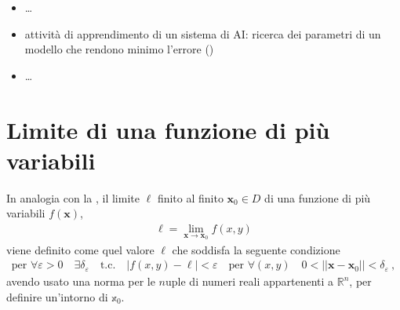 \documentclass[letterpaper,10pt,italian]{jupyterBook}
\begin{document}
\begin{itemize}
\begin{itemize}
\item {} 
\sphinxAtStartPar
…

\item {} 
\sphinxAtStartPar
attività di apprendimento di un sistema di AI: ricerca dei parametri di un modello che rendono minimo l’errore ()

\item {} 
\sphinxAtStartPar
…

\end{itemize}

\end{itemize}



\sphinxstepscope


\section{Limite di una funzione di più variabili}
\label{\detokenize{ch/multivariable-calculus/limits:limite-di-una-funzione-di-piu-variabili}}\label{\detokenize{ch/multivariable-calculus/limits:multivariable-calculus-limit}}\label{\detokenize{ch/multivariable-calculus/limits::doc}}
\sphinxAtStartPar
In analogia con la {\hyperref[\detokenize{ch/infinitesimal_calculus/analysis:infinitesimal-calculus-limits-def}]{}}, il limite \(\ell\) finito al finito \(\mathbf{x}_0 \in D\) di una funzione di più variabili \(f(\mathbf{x})\),
\begin{equation*}
\begin{split}\ell = \lim_{\mathbf{x} \rightarrow \mathbf{x}_0} f(x,y)\end{split}
\end{equation*}
\sphinxAtStartPar
viene definito come quel valore \(\ell\) che soddisfa la seguente condizione
\begin{equation*}
\begin{split}\text{per } \forall \varepsilon > 0 \quad \exists \delta_{\varepsilon} \quad \text{t.c.} \quad |f(x,y) - \ell| < \varepsilon \quad \text{per } \forall (x,y) \quad 0 < || \mathbf{x} - \mathbf{x}_0|| < \delta_\varepsilon \ ,\end{split}
\end{equation*}
\sphinxAtStartPar
avendo usato una norma per le \(n\)\sphinxhyphen{}uple di numeri reali appartenenti a \(\mathbb{R}^n\), per definire un’intorno di \(\mathbb{x}_0\).
\end{document}
